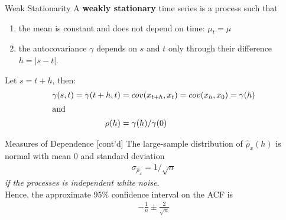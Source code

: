 \documentclass[ignorenonframetext,xcolor=x11names]{beamer}
\begin{document}
\begin{frame}[label=full]{Weak Stationarity}
A \textbf{weakly stationary} time series is a process such that
\begin{enumerate}
\item the mean is constant and does not depend on time: $\mu_t = \mu$
\item the autocovariance $\gamma$ depends on $s$ and $t$ only through their difference $h=|s-t|$.
\end{enumerate}
Let $s = t + h$, then:
\begin{align*}
\gamma(s, t) = \gamma(t+h, t) &= cov(x_{t+h}, x_t) = cov(x_h, x_0) = \gamma(h) \\
\intertext{and}
\rho(h) &= \gamma(h) / \gamma(0)
\end{align*}
\end{frame}

\begin{frame}[label=full]{Measures of Dependence \small [cont'd]}
The large-sample distribution of $\hat{\rho}_{x}(h)$ is normal with mean $0$ and standard deviation
\begin{align*}
\sigma_{\hat{\rho}_{x}} = 1/ \sqrt{n} 
\end{align*}
\emph{if the processes is independent white noise}. \\

Hence, the approximate 95\% confidence interval on the ACF is
\begin{align*}
-\frac{1}{n} \pm \frac{2}{\sqrt{n}}
\end{align*}
\end{frame}


\end{document}
